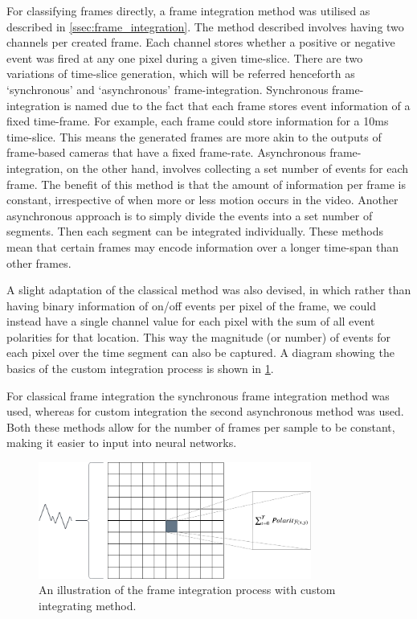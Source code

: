 For classifying frames directly, a frame integration method was utilised as described in \cref{ssec:frame_integration}. The method described involves having two channels per created frame. Each channel stores whether a positive or negative event was fired at any one pixel during a given time-slice. There are two variations of time-slice generation, which will be referred henceforth as `synchronous' and `asynchronous' frame-integration. Synchronous frame-integration is named due to the fact that each frame stores event information of a fixed time-frame. For example, each frame could store information for a 10ms time-slice. This means the generated frames are more akin to the outputs of frame-based cameras that have a fixed frame-rate. Asynchronous frame-integration, on the other hand, involves collecting a set number of events for each frame. The benefit of this method is that the amount of information per frame is constant, irrespective of when more or less motion occurs in the video. Another asynchronous approach is to simply divide the events into a set number of segments. Then each segment can be integrated individually. These methods mean that certain frames may encode information over a longer time-span than other frames.

A slight adaptation of the classical method was also devised, in which rather than having binary information of on/off events per pixel of the frame, we could instead have a single channel value for each pixel with the sum of all event polarities for that location. This way the magnitude (or number) of events for each pixel over the time segment can also be captured. A diagram showing the basics of the custom integration process is shown in \cref{fig:frame_integration_diagram}.

For classical frame integration the synchronous frame integration method was used, whereas for custom integration the second asynchronous method was used. Both these methods allow for the number of frames per sample to be constant, making it easier to input into neural networks.

\begin{figure}[htb]
    \centering
    \includegraphics[width=0.8\textwidth]{analysisanddesign/images/frame_integration_illustration.png}
    \caption{An illustration of the frame integration process with custom integrating method.}
    \label{fig:frame_integration_diagram}
\end{figure}

